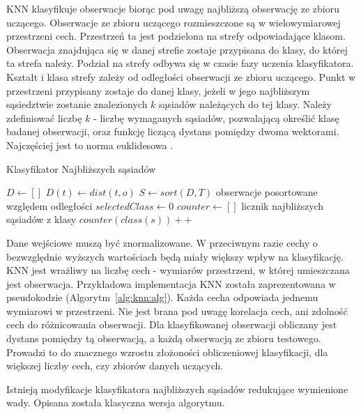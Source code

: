 \documentclass[a4paper,12pt,twoside,openany]{report}
\newcommand{\Alg}[1]{(Algorytm~\ref{#1})}
\begin{document}
KNN klasyfikuje obserwacje biorąc pod uwagę najbliższą obserwację ze zbioru uczącego.
Obserwacje ze zbioru uczącego rozmieszczone są w wielowymiarowej przestrzeni cech.
Przestrzeń ta jest podzielona na strefy odpowiadające klasom.
Obserwacja znajdująca się w danej strefie zostaje przypisana do klasy, do której ta strefa należy.
Podział na strefy odbywa się w czasie fazy uczenia klasyfikatora.
Kształt i klasa strefy zależy od odległości obserwacji ze zbioru uczącego.
Punkt w przestrzeni przypisany zostaje do danej klasy, jeżeli w jego najbliższym sąsiedztwie zostanie znalezionych $k$ sąsiadów należących do tej klasy.
Należy zdefiniować liczbę $k$ - liczbę wymaganych sąsiadów, pozwalającą określić klasę badanej obserwacji, 
oraz funkcję liczącą dystans pomiędzy dwoma wektorami. Najczęściej jest to norma euklidesowa \cite{Martin2011}.

\begin{algorithm}
	\caption{Klasyfikator Najbliższych sąsiadów}
	\begin{algorithmic}[1]
		\State $D \leftarrow [ ]$
		\State $D(t) \leftarrow dist(t, o)$
		\EndFor
		\State $S \leftarrow sort(D, T)$ \Comment obserwacje posortowane względem odległości
		\State $selectedClass \leftarrow 0$
		\State $counter \leftarrow [ ]$ \Comment licznik najbliższych sąsiadów z klasy
		\Repeat
		\State $counter(class(s))++$
		\EndFor
		\EndProcedure
	\end{algorithmic}
	\label{alg:knn:alg}
\end{algorithm}

Dane wejściowe muszą być znormalizowane. 
W przeciwnym razie cechy o bezwzględnie wyższych wartościach będą miały większy wpływ na klasyfikację.
KNN jest wrażliwy na liczbę cech - wymiarów przestrzeni, w której umieszczana jest obserwacja. 
Przykładowa implementacja KNN została zaprezentowana w pseudokodzie \Alg{alg:knn:alg}.
Każda cecha odpowiada jednemu wymiarowi w przestrzeni.
Nie jest brana pod uwagę korelacja cech, ani zdolność cech do różnicowania obserwacji.
Dla klasyfikowanej obserwacji obliczany jest dystans pomiędzy tą obserwacją,
a każdą obserwacją ze zbioru testowego.
Prowadzi to do znacznego wzrostu złożoności obliczeniowej klasyfikacji, dla większej liczby cech, czy zbiorów danych uczących.

Istnieją modyfikacje klasyfikatora najbliższych sąsiadów redukujące wymienione wady. 
Opisana została klasyczna wersja algorytmu.
\end{document}
